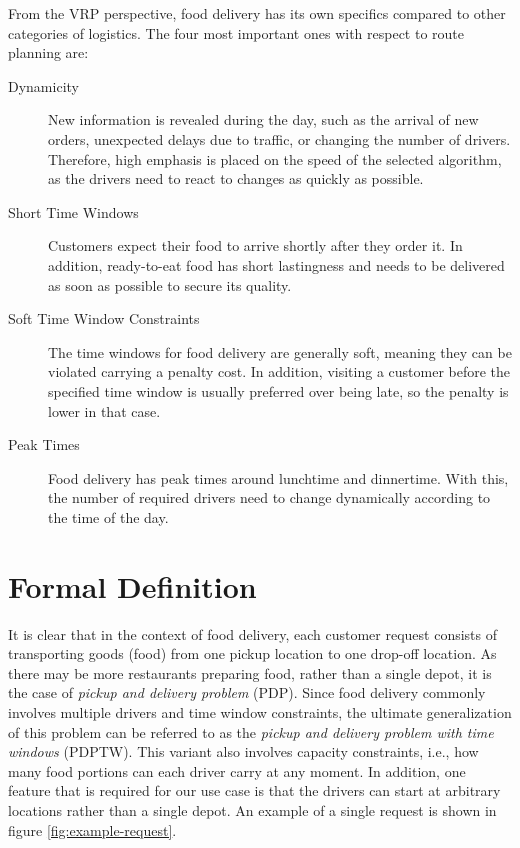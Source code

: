 From the VRP perspective, food delivery has its own specifics compared to other categories of logistics. The four most important ones with respect to route planning are:
\begin{description}
    \item[Dynamicity] New information is revealed during the day, such as the arrival of new orders, unexpected delays due to traffic, or changing the number of drivers. Therefore, high emphasis is placed on the speed of the selected algorithm, as the drivers need to react to changes as quickly as possible.
    \item[Short Time Windows] Customers expect their food to arrive shortly after they order it. In addition, ready-to-eat food has short lastingness and needs to be delivered as soon as possible to secure its quality.
    \item[Soft Time Window Constraints] The time windows for food delivery are generally soft, meaning they can be violated carrying a penalty cost. In addition, visiting a customer before the specified time window is usually preferred over being late, so the penalty is lower in that case.
    \item[Peak Times] Food delivery has peak times around lunchtime and dinnertime. With this, the number of required drivers need to change dynamically according to the time of the day.
\end{description}
    
\section{Formal Definition}
    
    It is clear that in the context of food delivery, each customer request consists of transporting goods (food) from one pickup location to one drop-off location. As there may be more restaurants preparing food, rather than a single depot, it is the case of \textit{pickup and delivery problem} (PDP). Since food delivery commonly involves multiple drivers and time window constraints, the ultimate generalization of this problem can be referred to as the \textit{pickup and delivery problem with time windows} (PDPTW). This variant also involves capacity constraints, i.e., how many food portions can each driver carry at any moment. In addition, one feature that is required for our use case is that the drivers can start at arbitrary locations rather than a single depot. An example of a single request is shown in figure \ref{fig:example-request}.
    
